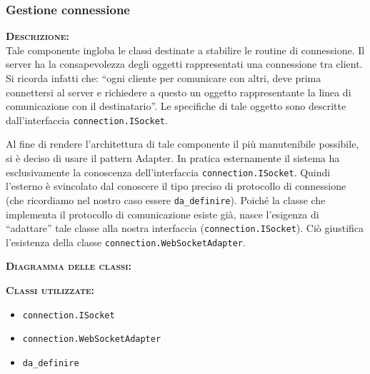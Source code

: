 \subsubsection{Gestione connessione}
\begin{description}
	\item{\scshape\bfseries Descrizione:}\\
Tale componente ingloba le classi destinate a stabilire le routine di connessione. Il server ha la consapevolezza degli oggetti rappresentati una connessione tra client. Si ricorda infatti che: ``ogni cliente per comunicare con altri, deve prima connettersi al server e richiedere a questo un oggetto rappresentante la linea di comunicazione con il destinatario''. Le specifiche di tale oggetto sono descritte dall'interfaccia \texttt{connection.ISocket}.

Al fine di rendere l'architettura di tale componente il più manutenibile possibile, si è deciso di usare il pattern Adapter. In pratica esternamente il sistema ha esclusivamente la conoscenza dell'interfaccia \texttt{connection.ISocket}. Quindi l'esterno è svincolato dal conoscere il tipo preciso di protocollo di connessione (che ricordiamo nel nostro caso essere \texttt{da\_definire}). Poiché la classe che implementa il protocollo di comunicazione esiste già, nasce l'esigenza di ``adattare'' tale classe alla nostra interfaccia (\texttt{connection.ISocket}). Ciò giustifica l'esistenza della classe \texttt{connection.WebSocketAdapter}.
	\item{\scshape\bfseries Diagramma delle classi:}
	\item{\scshape\bfseries Classi utilizzate:}
\begin{itemize}
  \item \texttt{connection.ISocket}
  \item \texttt{connection.WebSocketAdapter}
  \item \texttt{da\_definire}
\end{itemize}
\end{description}

